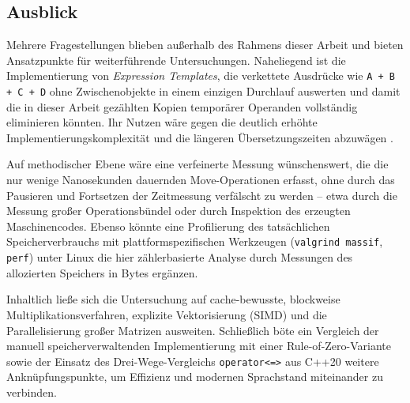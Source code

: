 \documentclass[10pt,a4paper]{article}
\begin{document}
\subsection{Ausblick}
\label{sec:ausblick}
 
Mehrere Fragestellungen blieben außerhalb des Rahmens dieser Arbeit und bieten
Ansatzpunkte für weiterführende Untersuchungen. Naheliegend ist die
Implementierung von \emph{Expression Templates}, die verkettete Ausdrücke wie
\texttt{A + B + C + D} ohne Zwischenobjekte in einem einzigen Durchlauf
auswerten und damit die in dieser Arbeit gezählten Kopien temporärer Operanden
vollständig eliminieren könnten. Ihr Nutzen wäre gegen die deutlich erhöhte
Implementierungskomplexität und die längeren Übersetzungszeiten abzuwägen \cite{veldhuizen1995,vandevoorde2017}.
 
Auf methodischer Ebene wäre eine verfeinerte Messung wünschenswert, die die
nur wenige Nanosekunden dauernden Move-Operationen erfasst, ohne durch das
Pausieren und Fortsetzen der Zeitmessung verfälscht zu werden -- etwa durch die
Messung großer Operationsbündel oder durch Inspektion des erzeugten
Maschinencodes. Ebenso könnte eine Profilierung des tatsächlichen
Speicherverbrauchs mit plattformspezifischen Werkzeugen (\texttt{valgrind
massif}, \texttt{perf}) unter Linux die hier zählerbasierte Analyse durch
Messungen des allozierten Speichers in Bytes ergänzen.
 
Inhaltlich ließe sich die Untersuchung auf cache-bewusste, blockweise
Multiplikationsverfahren, explizite Vektorisierung (SIMD) und die
Parallelisierung großer Matrizen ausweiten. Schließlich böte ein Vergleich der
manuell speicherverwaltenden Implementierung mit einer Rule-of-Zero-Variante
sowie der Einsatz des Drei-Wege-Vergleichs \texttt{operator<=>} aus C++20 weitere
Anknüpfungspunkte, um Effizienz und modernen Sprachstand miteinander zu
verbinden.
 
\end{document}
